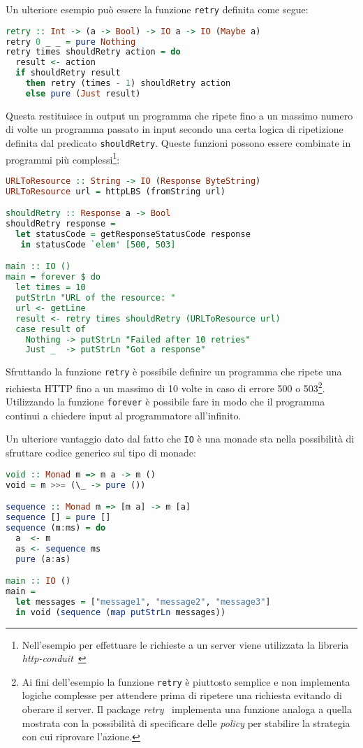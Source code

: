 Un ulteriore esempio può essere la funzione \lstinline{retry} definita come segue:
\begin{lstlisting}[language=haskell]
retry :: Int -> (a -> Bool) -> IO a -> IO (Maybe a)
retry 0 _ _ = pure Nothing
retry times shouldRetry action = do
  result <- action
  if shouldRetry result
    then retry (times - 1) shouldRetry action
    else pure (Just result)
\end{lstlisting}
Questa restituisce in output un programma che ripete fino a un massimo numero di volte un programma passato in input secondo una certa logica di ripetizione definita dal predicato \lstinline{shouldRetry}.
Queste funzioni possono essere combinate in programmi più complessi\footnote{Nell'esempio per effettuare le richieste a un server viene utilizzata la libreria \emph{http-conduit}~\cite{cit:http-conduit}}:
\begin{lstlisting}[language=haskell]
URLToResource :: String -> IO (Response ByteString)
URLToResource url = httpLBS (fromString url)

shouldRetry :: Response a -> Bool
shouldRetry response =
  let statusCode = getResponseStatusCode response
   in statusCode `elem' [500, 503]

main :: IO ()
main = forever $ do
  let times = 10
  putStrLn "URL of the resource: "
  url <- getLine  
  result <- retry times shouldRetry (URLToResource url)
  case result of
    Nothing -> putStrLn "Failed after 10 retries"
    Just _  -> putStrLn "Got a response"
\end{lstlisting}
Sfruttando la funzione \lstinline{retry} è possibile definire un programma che ripete una richiesta HTTP fino a un massimo di 10 volte in caso di errore 500 o 503\footnote{Ai fini dell'esempio la funzione \lstinline{retry} è piuttosto semplice e non implementa logiche complesse per attendere prima di ripetere una richiesta evitando di oberare il server. Il package \emph{retry}~\cite{cit:retry} implementa una funzione analoga a quella mostrata con la possibilità di specificare delle \emph{policy} per stabilire la strategia con cui riprovare l'azione.}. Utilizzando la funzione \lstinline{forever} è possibile fare in modo che il programma continui a chiedere input al programmatore all'infinito.

Un ulteriore vantaggio dato dal fatto che \lstinline{IO} è una monade sta nella possibilità di sfruttare codice generico sul tipo di monade:

\begin{lstlisting}[language=haskell]
void :: Monad m => m a -> m ()
void = m >>= (\_ -> pure ())

sequence :: Monad m => [m a] -> m [a]
sequence [] = pure []
sequence (m:ms) = do
  a  <- m
  as <- sequence ms
  pure (a:as)

main :: IO ()
main =
  let messages = ["message1", "message2", "message3"]
  in void (sequence (map putStrLn messages))
\end{lstlisting}

